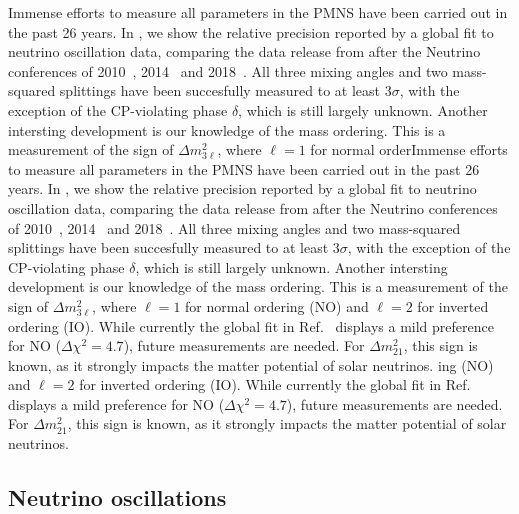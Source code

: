 Immense efforts to measure all parameters in the PMNS have been carried out in the past 26 years. In , we show the relative precision reported by a global fit to neutrino oscillation data, comparing the data release from after the Neutrino conferences of 2010~\cite{Schwetz:2011qt}, 2014~\cite{Gonzalez-Garcia:2014bfa} and 2018~\cite{Esteban:2018azc}. All three mixing angles and two mass-squared splittings have been succesfully measured to at least $3\sigma$, with the exception of the CP-violating phase $\delta$, which is still largely unknown. Another intersting development is our knowledge of the mass ordering. This is a measurement of the sign of $\Delta m^2_{3\ell}$, where $\ell = 1$ for normal orderImmense efforts to measure all parameters in the PMNS have been carried out in the past 26 years. In , we show the relative precision reported by a global fit to neutrino oscillation data, comparing the data release from after the Neutrino conferences of 2010~\cite{Schwetz:2011qt}, 2014~\cite{Gonzalez-Garcia:2014bfa} and 2018~\cite{Esteban:2018azc}. All three mixing angles and two mass-squared splittings have been succesfully measured to at least $3\sigma$, with the exception of the CP-violating phase $\delta$, which is still largely unknown. Another intersting development is our knowledge of the mass ordering. This is a measurement of the sign of $\Delta m^2_{3\ell}$, where $\ell = 1$ for normal ordering (NO) and $\ell = 2$ for inverted ordering (IO). While currently the global fit in Ref.~\cite{Esteban:2018azc} displays a mild preference for NO ($\Delta \chi^2 = 4.7$), future measurements are needed. For $\Delta m^2_{21}$, this sign is known, as it strongly impacts the matter potential of solar neutrinos.
ing (NO) and $\ell = 2$ for inverted ordering (IO). While currently the global fit in Ref.~\cite{Esteban:2018azc} displays a mild preference for NO ($\Delta \chi^2 = 4.7$), future measurements are needed. For $\Delta m^2_{21}$, this sign is known, as it strongly impacts the matter potential of solar neutrinos.


\subsection{Neutrino oscillations}

